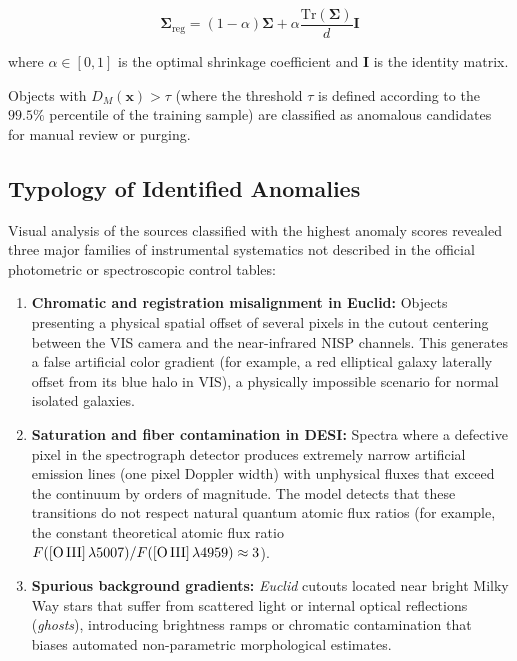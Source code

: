 \begin{equation}
\boldsymbol{\Sigma}_{\text{reg}} = (1 - \alpha) \boldsymbol{\Sigma} + \alpha \frac{\text{Tr}(\boldsymbol{\Sigma})}{d} \mathbf{I}
\label{eq:ap_regularized_cov}
\end{equation}

where $\alpha \in [0, 1]$ is the optimal shrinkage coefficient and $\mathbf{I}$ is the identity matrix.

Objects with $D_M(\mathbf{x}) > \tau$ (where the threshold $\tau$ is defined according to the $99.5\%$ percentile of the training sample) are classified as anomalous candidates for manual review or purging.

\subsection{Typology of Identified Anomalies}

Visual analysis of the sources classified with the highest anomaly scores revealed three major families of instrumental systematics not described in the official photometric or spectroscopic control tables:

\begin{enumerate}
	\item \textbf{Chromatic and registration misalignment in Euclid:} 
	Objects presenting a physical spatial offset of several pixels in the cutout centering between the VIS camera and the near-infrared NISP channels. This generates a false artificial color gradient (for example, a red elliptical galaxy laterally offset from its blue halo in VIS), a physically impossible scenario for normal isolated galaxies.
	
	\item \textbf{Saturation and fiber contamination in DESI:}
	Spectra where a defective pixel in the spectrograph detector produces extremely narrow artificial emission lines (one pixel Doppler width) with unphysical fluxes that exceed the continuum by orders of magnitude. The model detects that these transitions do not respect natural quantum atomic flux ratios (for example, the constant theoretical atomic flux ratio $F([\text{O\,III}]\,\lambda 5007) / F([\text{O\,III}]\,\lambda 4959) \approx 3$).
	
	\item \textbf{Spurious background gradients:}
	\textit{Euclid} cutouts located near bright Milky Way stars that suffer from scattered light or internal optical reflections (\textit{ghosts}), introducing brightness ramps or chromatic contamination that biases automated non-parametric morphological estimates.
\end{enumerate}

